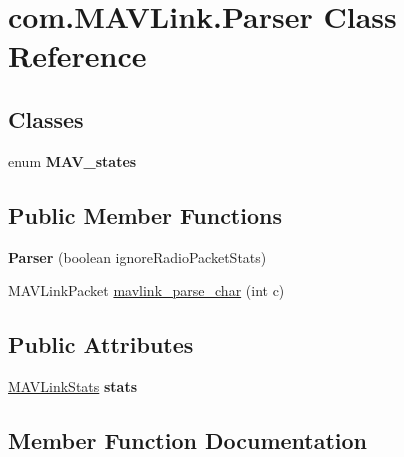 \hypertarget{classcom_1_1MAVLink_1_1Parser}{}\section{com.\+M\+A\+V\+Link.\+Parser Class Reference}
\label{classcom_1_1MAVLink_1_1Parser}
\subsection*{Classes}
\begin{DoxyCompactItemize}
\item 
enum {\bfseries M\+A\+V\+\_\+states}
\end{DoxyCompactItemize}
\subsection*{Public Member Functions}
\begin{DoxyCompactItemize}
\item 
\mbox{\label{classcom_1_1MAVLink_1_1Parser_a133de554c9c5a60a826ce503113a7928}} 
{\bfseries Parser} (boolean ignore\+Radio\+Packet\+Stats)
\item 
M\+A\+V\+Link\+Packet \hyperlink{classcom_1_1MAVLink_1_1Parser_a07c7cd220c75b191607adf6bed968d04}{mavlink\+\_\+parse\+\_\+char} (int c)
\end{DoxyCompactItemize}
\subsection*{Public Attributes}
\begin{DoxyCompactItemize}
\item 
\mbox{\label{classcom_1_1MAVLink_1_1Parser_a877d3b72d9f431b5adca695feb5b7496}} 
\hyperlink{classcom_1_1MAVLink_1_1Messages_1_1MAVLinkStats}{M\+A\+V\+Link\+Stats} {\bfseries stats}
\end{DoxyCompactItemize}


\subsection{Member Function Documentation}
\mbox{\label{classcom_1_1MAVLink_1_1Parser_a07c7cd220c75b191607adf6bed968d04}} 

